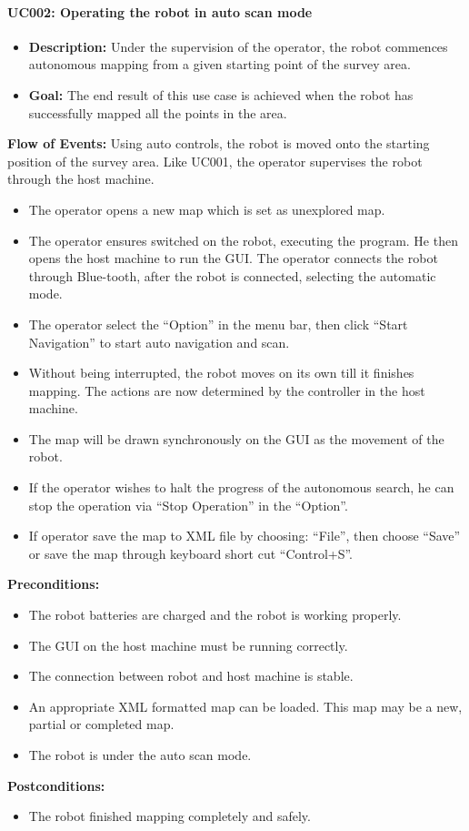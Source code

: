 \documentclass[11pt, a4paper]{report}
\begin{document}
\paragraph {UC002: Operating the robot in auto scan mode}
	\begin{itemize}
		\item \textbf{Description:} Under the supervision of the operator, the robot commences autonomous mapping from a given starting point of the survey area.
		\item \textbf{Goal:} The end result of this use case is achieved when the robot has successfully mapped all the points in the area.
	\end{itemize}
	\textbf{Flow of Events:} Using auto controls, the robot is moved onto the starting position of the
survey area. Like UC001, the operator supervises the robot through the host machine.
	\begin{itemize}
		\item The operator opens a new map which is set as unexplored map.  
		\item The operator ensures switched on the robot, executing the program. He then
opens the host machine to run the GUI. The operator connects the robot through Blue-tooth, after the robot is connected, selecting the automatic mode.
		\item The operator select the ``Option'' in the menu bar, then click ``Start Navigation'' to start auto navigation and scan.
		\item Without being interrupted, the robot moves on its own till it finishes mapping. The actions are now determined by the controller in the host machine.
		\item The map will be drawn synchronously on the GUI as the movement of the robot.  
		\item If the operator wishes to halt the progress of the autonomous search, he can stop the operation via ``Stop Operation'' in the ``Option''. 
    \item If operator save the map to XML file by choosing: ``File'', then choose ``Save'' or save the map through keyboard short cut ``Control+S''.
	\end{itemize}
	\textbf{Preconditions:}
	\begin{itemize}
		\item The robot batteries are charged and the robot is working properly.
		\item The GUI on the host machine must be running correctly.
		\item The connection between robot and host machine is stable.
		\item An appropriate XML formatted map can be loaded. This map may be a new, partial or
completed map.
		\item The robot is under the auto scan mode.
	\end{itemize}
	\textbf{Postconditions:}
	\begin{itemize}
		\item The robot finished mapping completely and safely.
	\end{itemize}
\end{document}
